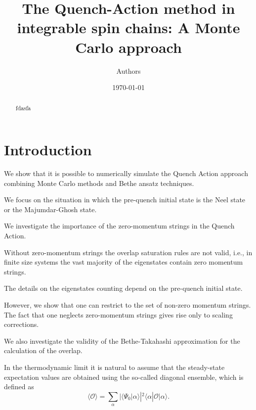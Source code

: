 \documentclass[11pt]{iopart}
\begin{document}
\setlength{\parindent}{0pt}


\title{The Quench-Action method in integrable spin chains: A Monte Carlo 
approach}

\author{Authors}


\date{\today}



\begin{abstract} 


fdasfa
\end{abstract}

\maketitle

\section{Introduction}
\label{intro}

We show that it is possible to numerically simulate the Quench Action approach 
combining Monte Carlo methods and Bethe ansatz techniques. 

We focus on the situation in which the pre-quench initial state is the Neel 
state or the Majumdar-Ghosh state. 

We investigate the importance of the zero-momentum strings in the Quench Action. 

Without zero-momentum strings the overlap saturation rules are not valid, 
i.e., in finite size systems the vast majority of the eigenstates contain 
zero momentum strings. 

The details on the eigenstates counting depend on the pre-quench initial state. 

However, we show that one can restrict to the set of non-zero momentum strings. 
The fact that one neglects zero-momentum strings gives rise only to scaling 
corrections. 

We also investigate the validity of the Bethe-Takahashi approximation for the 
calculation of the overlap. 

In the thermodynamic limit it is natural to assume that the steady-state expectation 
values are obtained using the so-called diagonal ensemble, which is defined as 
%
\begin{equation}
\label{d-ensemble}
\langle{\mathcal O}\rangle=\sum\limits_{\alpha}|\langle\Psi_0|\alpha\rangle|^2
\langle\alpha|{\mathcal O}|\alpha\rangle. 
\end{equation}
%
\end{document}
